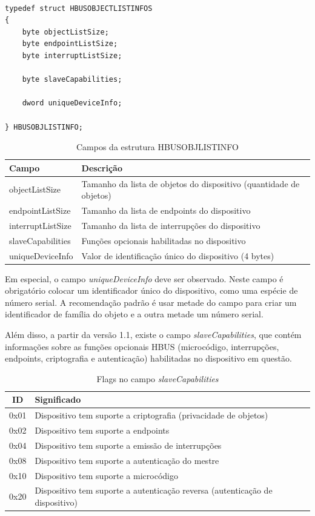 \documentclass[11pt]{report}
\begin{document}
\begin{verbatim}

typedef struct HBUSOBJECTLISTINFOS
{
	byte objectListSize;
	byte endpointListSize;
	byte interruptListSize;
	
	byte slaveCapabilities;
	
	dword uniqueDeviceInfo;
	
} HBUSOBJLISTINFO;

\end{verbatim}

\begin{table}[H]
\centering
\caption{Campos da estrutura HBUSOBJLISTINFO}
\begin{tabular}{l p{13cm}}

\hline
Campo					&	Descrição\\
\hline
objectListSize			&	Tamanho da lista de objetos do dispositivo (quantidade de objetos)\\
endpointListSize			&	Tamanho da lista de endpoints do dispositivo\\
interruptListSize		&	Tamanho da lista de interrupções do dispositivo\\
slaveCapabilities		&	Funções opcionais habilitadas no dispositivo\\
uniqueDeviceInfo			&	Valor de identificação único do dispositivo (4 bytes)\\
\hline

\end{tabular}
\end{table}

Em especial, o campo \textit{uniqueDeviceInfo} deve ser observado. Neste campo é obrigatório colocar um identificador único do dispositivo, como uma espécie de número serial. A recomendação padrão é usar metade do campo para criar um identificador de família do objeto e a outra metade um número serial.

Além disso, a partir da versão 1.1, existe o campo \textit{slaveCapabilities}, que contém informações sobre as funções opcionais HBUS (microcódigo, interrupções, endpoints, criptografia e autenticação) habilitadas no dispositivo em questão.

\begin{table}[H]
\centering
\caption{Flags no campo \textit{slaveCapabilities}}
\begin{tabular}{c p{13cm}}
\hline
ID		&	Significado\\
\hline
0x01		&	Dispositivo tem suporte a criptografia (privacidade de objetos)\\
0x02		&	Dispositivo tem suporte a endpoints\\
0x04		&	Dispositivo tem suporte a emissão de interrupções\\
0x08		&	Dispositivo tem suporte a autenticação do mestre\\
0x10		&	Dispositivo tem suporte a microcódigo\\
0x20		&	Dispositivo tem suporte a autenticação reversa (autenticação de dispositivo)\\
\hline
\end{tabular}
\end{table}
\end{document}
